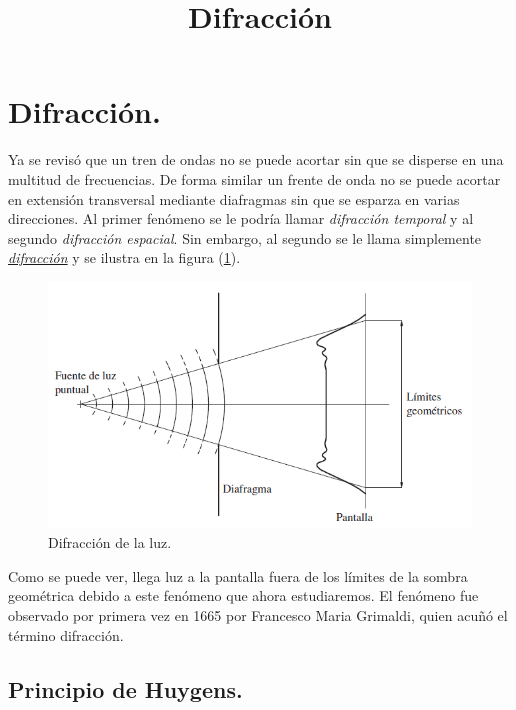 \documentclass[14pt]{extarticle}
\title{\vspace*{-2cm} Difracción}
\date{ }
\begin{document}
\maketitle

\section{Difracción.}

Ya se revisó que un tren de ondas no se puede acortar sin que se disperse en una multitud de frecuencias. De forma similar un frente de onda no se puede acortar en extensión transversal mediante diafragmas sin que se esparza en varias direcciones. Al primer fenómeno se le podría llamar \textit{difracción temporal} y al segundo \textit{difracción espacial}. Sin embargo, al segundo se le llama simplemente \underline{\textit{difracción}} y se ilustra en la figura (\ref{fig:figura_X_01}).
\begin{figure}[H]
    \centering
    \includegraphics[scale=0.75]{Imagenes/Difraccion_01.png}
    \caption{Difracción de la luz.}
    \label{fig:figura_X_01}
\end{figure}
Como se puede ver, llega luz a la pantalla fuera de los límites de la sombra geométrica debido a este fenómeno que ahora estudiaremos. El fenómeno fue observado por primera vez en 1665 por Francesco Maria Grimaldi, quien acuñó el término difracción.

\subsection{Principio de Huygens.}
\end{document}
